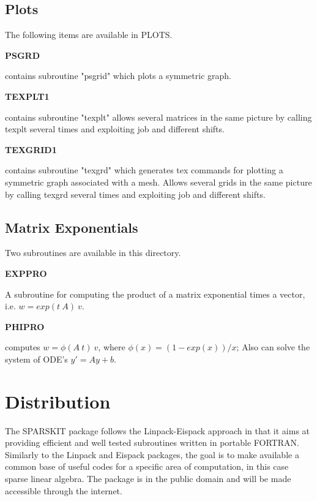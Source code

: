 \documentclass[12pt]{article}
\def\marg#1{\parbox[b]{1.3in}{\bf #1}}
\def\disp#1{\parbox[t]{4.62in}{#1} \vskip 0.2in }
\begin{document}
\subsection{Plots}
The following items are available in PLOTS. 

\vskip 0.3in

%
%

\marg{ PSGRD}\disp{ contains subroutine "psgrid" which plots 
  a symmetric graph.}


\marg{ TEXPLT1}\disp{ contains subroutine "texplt" allows 
  several matrices in the same picture by calling texplt several 
  times and exploiting job and different shifts.}

\marg{ TEXGRID1}\disp{ contains subroutine "texgrd" which  
  generates tex commands for plotting a symmetric graph associated
  with a mesh. Allows several grids in the same picture by 
  calling texgrd several times and exploiting job and different 
  shifts.}  


\subsection{Matrix Exponentials}
Two subroutines are available in this directory.
\vskip 0.3in
\marg{ EXPPRO}\disp{ A subroutine for computing the product of a matrix 
  exponential times a vector, i.e. $w = exp(t\ A)\ v$.}
\marg{ PHIPRO}\disp{ computes $w = \phi(A\ t)\ v$,
  where $\phi(x) = (1-exp(x))/x$; Also can solve the 
  system of ODE's $ y'= A y + b$.}

\section{Distribution}
The SPARSKIT package 
follows the Linpack-Eispack approach in that it  aims at providing
efficient and well tested subroutines written in portable FORTRAN.
Similarly to the Linpack and Eispack packages, the goal is to
make available a common base of useful codes for a specific 
area of computation, in this case sparse linear algebra.
The package is in the public domain and will be made 
accessible through the internet.
\end{document}
